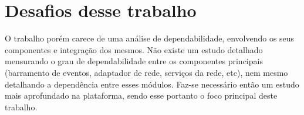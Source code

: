 \section{Desafios desse trabalho}
O trabalho porém carece de uma análise de dependabilidade, envolvendo os seus componentes e integração dos mesmos. Não existe um estudo detalhado mensurando o grau de dependabilidade entre os componentes principais (barramento de eventos, adaptador de rede, serviços da rede, etc), nem mesmo detalhando a dependência entre esses módulos. Faz-se necessário então um estudo mais aprofundado na plataforma, sendo esse portanto o foco principal deste trabalho.



























